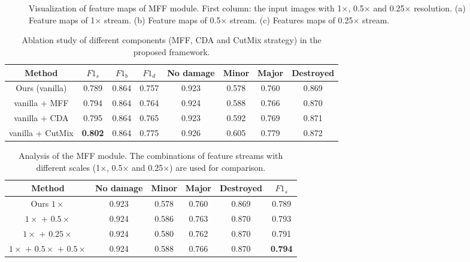 \documentclass[journal]{IEEEtran}
\begin{document}
\begin{figure}[t]
	\centering
	  \\
	   \\
	\caption{Visualization of feature maps of MFF module. First column: the input images with 1$\times$, 0.5$\times$ and 0.25$\times$ resolution. (a) Feature maps of 1$\times$ stream. (b) Feature maps of 0.5$\times$ stream. (c) Features maps of 0.25$\times$ stream.}
	\label{figMscale}
\end{figure}


\begin{table*}[!t]
	\centering
	\caption{Ablation study of different components (MFF, CDA and CutMix strategy) in the proposed framework. }
	\begin{tabular}{c|ccccccc}
		\hline
		\hline
    \textbf{Method}     & $F1_s$    & $F1_b$ & $F1_d$ & No damage & Minor & Major & Destroyed \\
    \hline
     Ours (vanilla) & 0.789 & 0.864 &	0.757 &	0.923 &	0.578 &	0.760 &	0.869 \\
     vanilla + MFF   & 0.794  &  0.864    & 0.764  & 0.924 & 0.588 & 0.766 &0.870\\
     vanilla + CDA   & 0.795  &  0.864    & 0.765  & 0.923 & 0.592 & 0.769 & 0.871 \\
     vanilla + CutMix  & \textbf{0.802}  &  0.864    & 0.775  & 0.926 & 0.605 & 0.779 & 0.872 \\
		\hline  \hline
	\end{tabular}
\label{tabAblitation}
\end{table*}


\begin{table}[!t]
	\centering
	\caption{Analysis of the MFF module. The combinations of feature streams with different scales (1$\times$, 0.5$\times$ and 0.25$\times$) are used for comparison. }
	\setlength{\tabcolsep}{1.15mm} {
	\begin{tabular}{c|cccc|c}
	\hline \hline
    Method    & No damage & Minor & Major & Destroyed  & $F1_s$ \\
    \hline
    Ours $1\times$ &0.923 &0.578 &0.760 &0.869 & 0.789  \\
     $1\times$ $+$ $0.5\times$ &  0.924 & 0.586 &  0.763  & 0.870   & 0.793\\
     $1\times$ $+$ $0.25\times$ & 0.924 &  0.580  & 0.762  & 0.870 &0.791\\
   $1\times$ $+$ $0.5\times$ $+$ $0.5\times$  &   0.924 & 0.588 & 0.766 &0.870    & \textbf{0.794}\\
		\hline  \hline
	\end{tabular}}
\label{tabAbNMFF}
\end{table}
\end{document}
